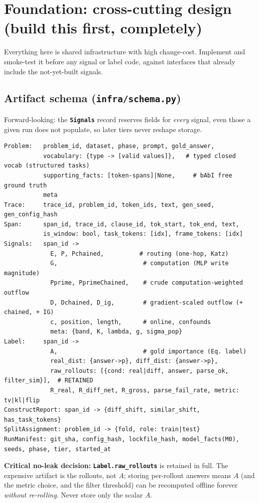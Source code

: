 \documentclass[11pt]{article}
\newcommand{\artifact}[1]{\textbf{\texttt{#1}}}
\begin{document}
\section{Foundation: cross-cutting design (build this first, completely)}
\label{sec:foundation}
Everything here is shared infrastructure with high change-cost. Implement and smoke-test it before any
signal or label code, against interfaces that already include the not-yet-built signals.

\subsection{Artifact schema (\texttt{infra/schema.py})}
Forward-looking: the \artifact{Signals} record reserves fields for \emph{every} signal, even those a
given run does not populate, so later tiers never reshape storage.
\begin{lstlisting}
Problem:   problem_id, dataset, phase, prompt, gold_answer,
           vocabulary: {type -> [valid values]},   # typed closed vocab (structured tasks)
           supporting_facts: [token-spans]|None,     # bAbI free ground truth
           meta
Trace:     trace_id, problem_id, token_ids, text, gen_seed, gen_config_hash
Span:      span_id, trace_id, clause_id, tok_start, tok_end, text,
           is_window: bool, task_tokens: [idx], frame_tokens: [idx]
Signals:   span_id ->
             E, P, Pchained,          # routing (one-hop, Katz)
             G,                        # computation (MLP write magnitude)
             Pprime, PprimeChained,    # crude computation-weighted outflow
             D, Dchained, D_ig,        # gradient-scaled outflow (+ chained, + IG)
             c, position, length,      # online, confounds
             meta: {band, K, lambda, g, sigma_pop}
Label:     span_id ->
             A,                        # gold importance (Eq. label)
             real_dist: {answer->p}, diff_dist: {answer->p},
             raw_rollouts: [{cond: real|diff, answer, parse_ok, filter_sim}],  # RETAINED
             R_real, R_diff_net, R_gross, parse_fail_rate, metric: tv|kl|flip
ConstructReport: span_id -> {diff_shift, similar_shift, has_task_tokens}
SplitAssignment: problem_id -> {fold, role: train|test}
RunManifest: git_sha, config_hash, lockfile_hash, model_facts(M0), seeds, phase, tier, started_at
\end{lstlisting}
\textbf{Critical no-leak decision:} \artifact{Label.raw\_rollouts} is retained in full. The expensive
artifact is the rollouts, not $A$; storing per-rollout answers means $A$ (and the metric choice, and the
filter threshold) can be recomputed offline forever \emph{without re-rolling}. Never store only the
scalar $A$.
\end{document}
